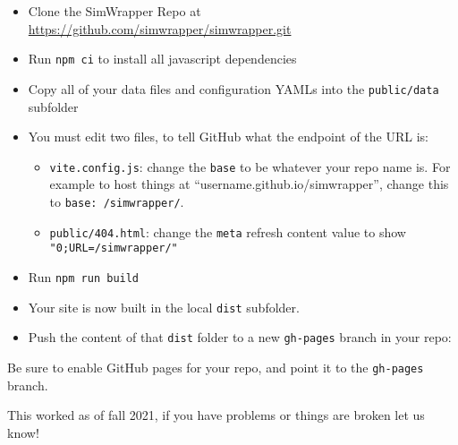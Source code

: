 \begin{itemize}
\tightlist
\item
  Clone the SimWrapper Repo at
  \url{https://github.com/simwrapper/simwrapper.git}
\item
  Run \texttt{npm\ ci} to install all javascript dependencies
\item
  Copy all of your data files and configuration YAMLs into the
  \texttt{public/data} subfolder
\item
  You must edit two files, to tell GitHub what the endpoint of the URL
  is:

  \begin{itemize}
  \tightlist
  \item
    \texttt{vite.config.js}: change the \texttt{base} to be whatever
    your repo name is. For example to host things at
    ``username.github.io/simwrapper'', change this to
    \texttt{base:\ \textquotesingle{}/simwrapper/\textquotesingle{}}.
  \item
    \texttt{public/404.html}: change the \texttt{meta} refresh content
    value to show
    \texttt{"0;URL=\textquotesingle{}/simwrapper/\textquotesingle{}"}
  \end{itemize}
\item
  Run \texttt{npm\ run\ build}
\item
  Your site is now built in the local \texttt{dist} subfolder.
\item
  Push the content of that \texttt{dist} folder to a new
  \texttt{gh-pages} branch in your repo:
\end{itemize}

\begin{Shaded}
\begin{Highlighting}[]
\KeywordTok{\&\&}  
\end{Highlighting}
\end{Shaded}

Be sure to enable GitHub pages for your repo, and point it to the
\texttt{gh-pages} branch.

This worked as of fall 2021, if you have problems or things are broken
let us know!

